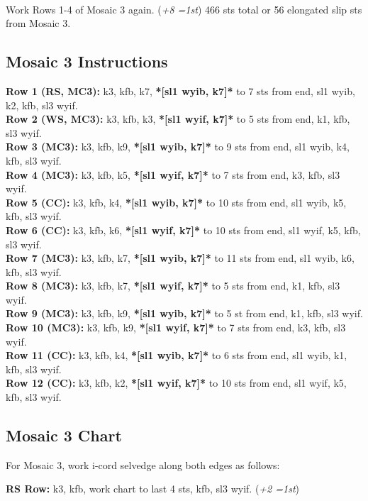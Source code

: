 \documentclass[12pt]{article}
\newcommand{\rowDir}[1]{\textbf{#1:}} %
\renewcommand{\repeat}[1]{\textbf{*[#1]*}} %
\newcommand{\increase}[1]{(\emph{+#1 
	\ifnum#1=1{st}\else{sts}\fi})}
\begin{document}
~\\
Work Rows 1-4 of Mosaic 3 again. \increase{8} 466 sts total or 56 elongated slip sts from Mosaic 3.

\subsection*{Mosaic 3 Instructions} %

\rowDir{Row 1 (RS, MC3)} k3, kfb, k7, \repeat{sl1 wyib, k7} to 7 sts from end, sl1 wyib, k2, kfb, sl3 wyif. \\
\rowDir{Row 2 (WS, MC3)} k3, kfb, k3, \repeat{sl1 wyif, k7} to 5 sts from end, k1, kfb, sl3 wyif. \\
\rowDir{Row 3 (MC3)} k3, kfb, k9, \repeat{sl1 wyib, k7} to 9 sts from end, sl1 wyib, k4, kfb, sl3 wyif. \\
\rowDir{Row 4 (MC3)} k3, kfb, k5, \repeat{sl1 wyif, k7} to 7 sts from end, k3, kfb, sl3 wyif. \\
\rowDir{Row 5 (CC)} k3, kfb, k4, \repeat{sl1 wyib, k7} to 10 sts from end, sl1 wyib, k5, kfb, sl3 wyif. \\
\rowDir{Row 6 (CC)} k3, kfb, k6, \repeat{sl1 wyif, k7} to 10 sts from end, sl1 wyif, k5, kfb, sl3 wyif. \\
\rowDir{Row 7 (MC3)} k3, kfb, k7, \repeat{sl1 wyib, k7} to 11 sts from end, sl1 wyib, k6, kfb, sl3 wyif. \\
\rowDir{Row 8 (MC3)} k3, kfb, k7, \repeat{sl1 wyif, k7} to 5 sts from end, k1, kfb, sl3 wyif. \\
\rowDir{Row 9 (MC3)} k3, kfb, k9, \repeat{sl1 wyib, k7} to 5 st from end, k1, kfb, sl3 wyif. \\
\rowDir{Row 10 (MC3)} k3, kfb, k9, \repeat{sl1 wyif, k7} to 7 sts from end, k3, kfb, sl3 wyif. \\
\rowDir{Row 11 (CC)} k3, kfb, k4, \repeat{sl1 wyib, k7} to 6 sts from end, sl1 wyib, k1, kfb, sl3 wyif. \\
\rowDir{Row 12 (CC)} k3, kfb, k2, \repeat{sl1 wyif, k7} to 10 sts from end, sl1 wyif, k5, kfb, sl3 wyif. 

\subsection*{Mosaic 3 Chart}

For Mosaic 3, work i-cord selvedge along both edges as follows:

\hspace{2em} \rowDir{RS Row} k3, kfb, work chart to last 4 sts, kfb, sl3 wyif. \increase{2}
\end{document}
